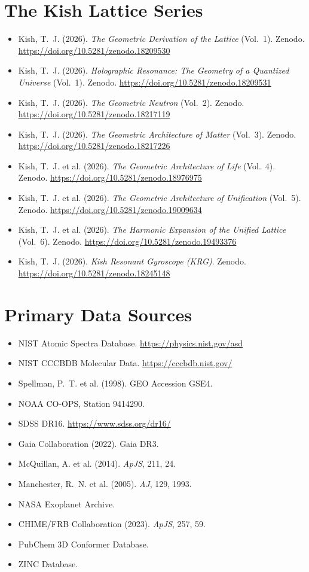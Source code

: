 \documentclass[11pt, letterpaper, openany]{book}
\begin{document}
\section*{The Kish Lattice Series}
\begin{itemize}
    \item Kish, T.~J. (2026). \textit{The Geometric Derivation of the Lattice} (Vol.~1).
          Zenodo. \url{https://doi.org/10.5281/zenodo.18209530}
	\item Kish, T.~J. (2026). \textit{Holographic Resonance: The Geometry of a Quantized
      Universe} (Vol.~1). Zenodo.
      \url{https://doi.org/10.5281/zenodo.18209531}
      \label{kish2026vol1}
    \item Kish, T.~J. (2026). \textit{The Geometric Neutron} (Vol.~2).
          Zenodo. \url{https://doi.org/10.5281/zenodo.18217119}
    \item Kish, T.~J. (2026). \textit{The Geometric Architecture of Matter} (Vol.~3).
          Zenodo. \url{https://doi.org/10.5281/zenodo.18217226}
    \item Kish, T.~J. et al. (2026). \textit{The Geometric Architecture of Life} (Vol.~4).
          Zenodo. \url{https://doi.org/10.5281/zenodo.18976975}
    \item Kish, T.~J. et al. (2026). \textit{The Geometric Architecture of Unification} (Vol.~5).
          Zenodo. \url{https://doi.org/10.5281/zenodo.19009634}
    \item Kish, T.~J. et al. (2026). \textit{The Harmonic Expansion of the Unified Lattice} (Vol.~6).
          Zenodo. \url{https://doi.org/10.5281/zenodo.19493376}
    \item Kish, T.~J. (2026). \textit{Kish Resonant Gyroscope (KRG)}.
          Zenodo. \url{https://doi.org/10.5281/zenodo.18245148}
\end{itemize}

\section*{Primary Data Sources}
\begin{itemize}
    \item NIST Atomic Spectra Database. \url{https://physics.nist.gov/asd}
    \item NIST CCCBDB Molecular Data. \url{https://cccbdb.nist.gov/}
    \item Spellman, P.~T. et al. (1998). GEO Accession GSE4.
    \item NOAA CO-OPS, Station 9414290.
    \item SDSS DR16. \url{https://www.sdss.org/dr16/}
    \item Gaia Collaboration (2022). Gaia DR3.
    \item McQuillan, A. et al. (2014). \textit{ApJS}, 211, 24.
    \item Manchester, R.~N. et al. (2005). \textit{AJ}, 129, 1993.
    \item NASA Exoplanet Archive.
    \item CHIME/FRB Collaboration (2023). \textit{ApJS}, 257, 59.
    \item PubChem 3D Conformer Database.
    \item ZINC Database.
\end{itemize}
\end{document}
